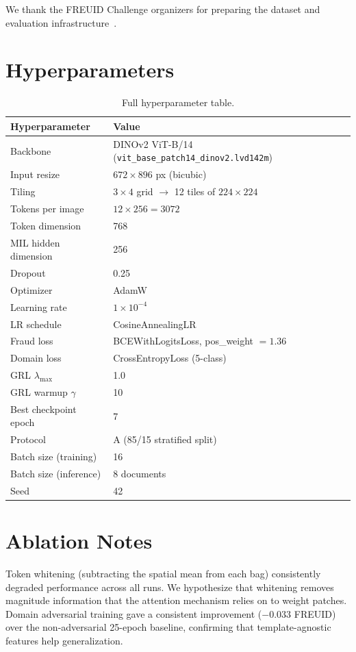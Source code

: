 \documentclass[11pt,a4paper]{article}
\begin{document}
We thank the FREUID Challenge organizers for preparing the dataset and evaluation infrastructure~\cite{freuid2026}.




\appendix
\section{Hyperparameters}
\label{app:hparams}

\begin{table}[h]
  \centering
  \small
  \begin{tabular}{ll}
    \toprule
    Hyperparameter & Value \\
    \midrule
    Backbone & DINOv2 ViT-B/14 (\texttt{vit\_base\_patch14\_dinov2.lvd142m}) \\
    Input resize & $672 \times 896$ px (bicubic) \\
    Tiling & $3 \times 4$ grid $\to$ 12 tiles of $224 \times 224$ \\
    Tokens per image & $12 \times 256 = 3072$ \\
    Token dimension & 768 \\
    MIL hidden dimension & 256 \\
    Dropout & 0.25 \\
    Optimizer & AdamW \\
    Learning rate & $1 \times 10^{-4}$ \\
    LR schedule & CosineAnnealingLR \\
    Fraud loss & BCEWithLogitsLoss, pos\_weight $= 1.36$ \\
    Domain loss & CrossEntropyLoss (5-class) \\
    GRL $\lambda_{\max}$ & 1.0 \\
    GRL warmup $\gamma$ & 10 \\
    Best checkpoint epoch & 7 \\
    Protocol & A (85/15 stratified split) \\
    Batch size (training) & 16 \\
    Batch size (inference) & 8 documents \\
    Seed & 42 \\
    \bottomrule
  \end{tabular}
  \caption{Full hyperparameter table.}
\end{table}

\section{Ablation Notes}

Token whitening (subtracting the spatial mean from each bag) consistently degraded performance across all runs. We hypothesize that whitening removes magnitude information that the attention mechanism relies on to weight patches. Domain adversarial training gave a consistent improvement ($-0.033$ FREUID) over the non-adversarial 25-epoch baseline, confirming that template-agnostic features help generalization.
\end{document}
